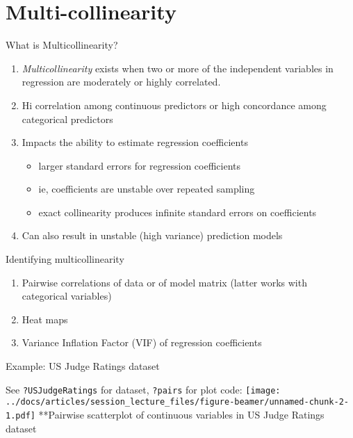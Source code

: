 \documentclass[
  ignorenonframetext,
]{beamer}
\providecommand{\tightlist}{%
  \setlength{\itemsep}{0pt}\setlength{\parskip}{0pt}}
\begin{document}
\hypertarget{multi-collinearity}{%
\section{Multi-collinearity}\label{multi-collinearity}}

\begin{frame}{What is Multicollinearity?}
\protect\hypertarget{what-is-multicollinearity}{}

\begin{enumerate}
\tightlist
\item
  \emph{Multicollinearity} exists when two or more of the independent
  variables in regression are moderately or highly correlated.
\item
  Hi correlation among continuous predictors or high concordance among
  categorical predictors
\item
  Impacts the ability to estimate regression coefficients

  \begin{itemize}
  \tightlist
  \item
    larger standard errors for regression coefficients
  \item
    ie, coefficients are unstable over repeated sampling
  \item
    exact collinearity produces infinite standard errors on coefficients
  \end{itemize}
\item
  Can also result in unstable (high variance) prediction models
\end{enumerate}

\end{frame}

\begin{frame}{Identifying multicollinearity}
\protect\hypertarget{identifying-multicollinearity}{}

\begin{enumerate}
\tightlist
\item
  Pairwise correlations of data or of model matrix (latter works with
  categorical variables)
\item
  Heat maps
\item
  Variance Inflation Factor (VIF) of regression coefficients
\end{enumerate}

\end{frame}

\begin{frame}[fragile]{Example: US Judge Ratings dataset}
\protect\hypertarget{example-us-judge-ratings-dataset}{}

See \texttt{?USJudgeRatings} for dataset, \texttt{?pairs} for plot code:
\texttt{[image: ../docs/articles/session\_lecture\_files/figure-beamer/unnamed-chunk-2-1.pdf]}
**Pairwise scatterplot of continuous variables in US Judge Ratings
dataset

\end{frame}
\end{document}
